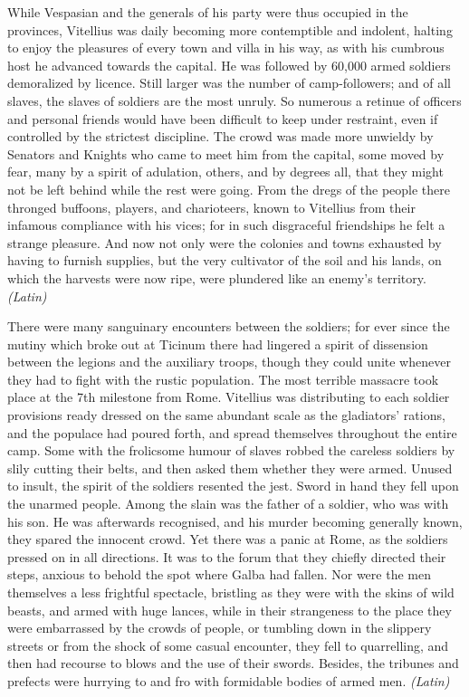 While Vespasian and the generals of his party were thus occupied in the provinces, Vitellius was daily becoming more contemptible and indolent, halting to enjoy the pleasures of every town and villa in his way, as with his cumbrous host he advanced towards the capital. He was followed by 60,000 armed soldiers demoralized by licence. Still larger was the number of camp-followers; and of all slaves, the slaves of soldiers are the most unruly. So numerous a retinue of officers and personal friends would have been difficult to keep under restraint, even if controlled by the strictest discipline. The crowd was made more unwieldy by Senators and Knights who came to meet him from the capital, some moved by fear, many by a spirit of adulation, others, and by degrees all, that they might not be left behind while the rest were going. From the dregs of the people there thronged buffoons, players, and charioteers, known to Vitellius from their infamous compliance with his vices; for in such disgraceful friendships he felt a strange pleasure. And now not only were the colonies and towns exhausted by having to furnish supplies, but the very cultivator of the soil and his lands, on which the harvests were now ripe, were plundered like an enemy's territory. \emph{(Latin)}


There were many sanguinary encounters between the soldiers; for ever since the mutiny which broke out at Ticinum there had lingered a spirit of dissension between the legions and the auxiliary troops, though they could unite whenever they had to fight with the rustic population. The most terrible massacre took place at the 7th milestone from Rome. Vitellius was distributing to each soldier provisions ready dressed on the same abundant scale as the gladiators' rations, and the populace had poured forth, and spread themselves throughout the entire camp. Some with the frolicsome humour of slaves robbed the careless soldiers by slily cutting their belts, and then asked them whether they were armed. Unused to insult, the spirit of the soldiers resented the jest. Sword in hand they fell upon the unarmed people. Among the slain was the father of a soldier, who was with his son. He was afterwards recognised, and his murder becoming generally known, they spared the innocent crowd. Yet there was a panic at Rome, as the soldiers pressed on in all directions. It was to the forum that they chiefly directed their steps, anxious to behold the spot where Galba had fallen. Nor were the men themselves a less frightful spectacle, bristling as they were with the skins of wild beasts, and armed with huge lances, while in their strangeness to the place they were embarrassed by the crowds of people, or tumbling down in the slippery streets or from the shock of some casual encounter, they fell to quarrelling, and then had recourse to blows and the use of their swords. Besides, the tribunes and prefects were hurrying to and fro with formidable bodies of armed men. \emph{(Latin)}

